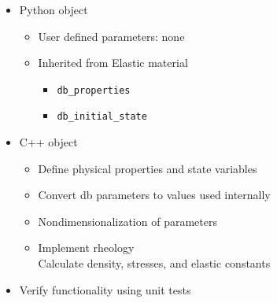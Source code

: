\documentclass[pdftex,cig,slideColor]{pp4slides}
\begin{document}
  \begin{itemize}
  \item Python object
    \begin{itemize}
    \item User defined parameters: none
    \item Inherited from Elastic material
      \begin{itemize}
      \item {\tt db\_properties}
      \item {\tt db\_initial\_state}
      \end{itemize}
    \end{itemize}
  \item C++ object
    \begin{itemize}
    \item Define physical properties and state variables
    \item Convert db parameters to values used internally
    \item Nondimensionalization of parameters
    \item Implement rheology \\
      Calculate density, stresses, and elastic constants
    \end{itemize}
  \item Verify functionality using unit tests
  \end{itemize}
 
 

 
\end{document}
